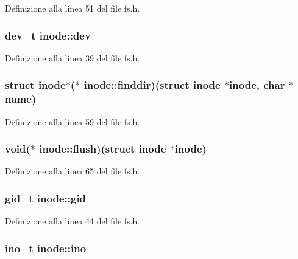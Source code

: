 Definizione alla linea 51 del file fs.\+h.

\hypertarget{structinode_a127a2eb030df332fa64a81188731ad6b}{
\subsubsection[{dev}]{\setlength{\rightskip}{0pt plus 5cm}dev\+\_\+t inode\+::dev}}\label{structinode_a127a2eb030df332fa64a81188731ad6b}


Definizione alla linea 39 del file fs.\+h.

\hypertarget{structinode_ab6c5e2d912fdbd506086e53185cd370d}{
\subsubsection[{finddir}]{\setlength{\rightskip}{0pt plus 5cm}struct {\bf inode}$\ast$($\ast$ inode\+::finddir)(struct {\bf inode} $\ast${\bf inode}, char $\ast${\bf name})}}\label{structinode_ab6c5e2d912fdbd506086e53185cd370d}


Definizione alla linea 59 del file fs.\+h.

\hypertarget{structinode_ae2972ef183f5c39aac7cb83b9f8a04a8}{
\subsubsection[{flush}]{\setlength{\rightskip}{0pt plus 5cm}void($\ast$ inode\+::flush)(struct {\bf inode} $\ast${\bf inode})}}\label{structinode_ae2972ef183f5c39aac7cb83b9f8a04a8}


Definizione alla linea 65 del file fs.\+h.

\hypertarget{structinode_a8434fb9dd05057d00b37ed713713835d}{
\subsubsection[{gid}]{\setlength{\rightskip}{0pt plus 5cm}gid\+\_\+t inode\+::gid}}\label{structinode_a8434fb9dd05057d00b37ed713713835d}


Definizione alla linea 44 del file fs.\+h.

\hypertarget{structinode_a1a77be0f24a6c9a18bbdbcecfb75df7c}{
\subsubsection[{ino}]{\setlength{\rightskip}{0pt plus 5cm}ino\+\_\+t inode\+::ino}}\label{structinode_a1a77be0f24a6c9a18bbdbcecfb75df7c}


